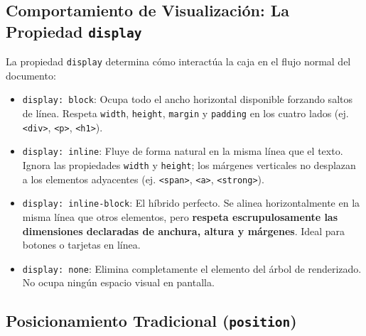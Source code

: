 \subsection{Comportamiento de Visualización: La Propiedad \texttt{display}}

La propiedad \texttt{display} determina cómo interactúa la caja en el flujo normal del documento:
\begin{itemize}[leftmargin=1.2cm]
  \item \texttt{display: block}: Ocupa todo el ancho horizontal disponible forzando saltos de línea. Respeta \texttt{width}, \texttt{height}, \texttt{margin} y \texttt{padding} en los cuatro lados (ej. \texttt{<div>}, \texttt{<p>}, \texttt{<h1>}).
  \item \texttt{display: inline}: Fluye de forma natural en la misma línea que el texto. Ignora las propiedades \texttt{width} y \texttt{height}; los márgenes verticales no desplazan a los elementos adyacentes (ej. \texttt{<span>}, \texttt{<a>}, \texttt{<strong>}).
  \item \texttt{display: inline-block}: El híbrido perfecto. Se alinea horizontalmente en la misma línea que otros elementos, pero \textbf{respeta escrupulosamente las dimensiones declaradas de anchura, altura y márgenes}. Ideal para botones o tarjetas en línea.
  \item \texttt{display: none}: Elimina completamente el elemento del árbol de renderizado. No ocupa ningún espacio visual en pantalla.
\end{itemize}

\subsection{Posicionamiento Tradicional (\texttt{position})}

